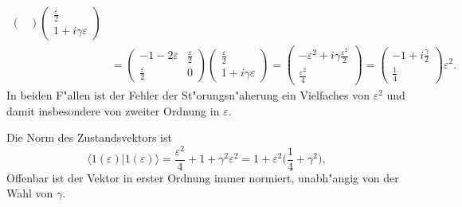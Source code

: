 \begin{loesung}
\begin{teilaufgaben}
\begin{align*}
\begin{pmatrix}
\end{pmatrix}
\begin{pmatrix}
\frac{\varepsilon}2\\1+i\gamma\varepsilon
\end{pmatrix}
\\
&=
\begin{pmatrix}
-1-2\varepsilon & \frac{\varepsilon}2\\
\frac{\varepsilon}2&0
\end{pmatrix}
\begin{pmatrix}
\frac{\varepsilon}2\\1+i\gamma\varepsilon
\end{pmatrix}
=
\begin{pmatrix}
-\varepsilon^2+i\gamma\frac{\varepsilon^2}{2}
\\
\frac{\varepsilon^2}{4}
\end{pmatrix}
=\begin{pmatrix}
-1+i\frac{\gamma}2\\\frac14
\end{pmatrix}\varepsilon^2.
\end{align*}
In beiden F"allen ist der Fehler der St"orungsn"aherung ein Vielfaches
von $\varepsilon^2$ und damit insbesondere von zweiter Ordnung in $\varepsilon$.
\item Die Norm des Zustandsvektors ist
\[
\langle 1(\varepsilon)|1(\varepsilon)\rangle
=
\frac{\varepsilon^2}4+1+\gamma^2 \varepsilon^2
=
1+\varepsilon^2\biggl(\frac14+\gamma^2\biggr),
\]
Offenbar ist der Vektor in erster Ordnung immer normiert, unabh"angig von
der Wahl von $\gamma$.
\end{teilaufgaben}
\end{loesung}

